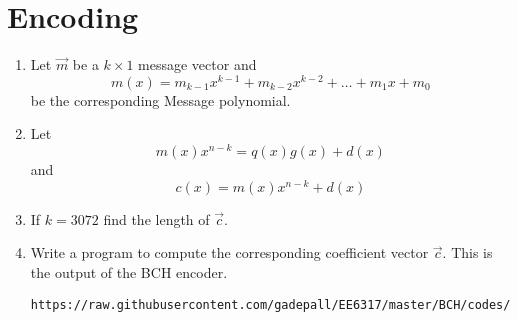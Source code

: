 \documentclass[journal,12pt,twocolumn]{IEEEtran}
\renewcommand\thesection{\arabic{section}}
\begin{document}
\section{Encoding}
\begin{enumerate}[label=\thesection.\arabic*
,ref=\thesection.\theenumi]
\item Let $\vec{m}$ be a $k \times 1$ message vector and  
\begin{equation}
m(x)=m_{k-1}x^{k-1}+m_{k-2}x^{k-2}+\dots+m_1x+m_0
\end{equation} 
be the  corresponding Message polynomial. 
\item Let 
\begin{equation}
m(x)x^{n-k} = q(x)g(x)+d(x)
\end{equation} 
and 
\begin{equation}
c(x)=m(x)x^{n-k}+d(x)
\end{equation}
%
\item If $k = 3072$ find the length of $\vec{c}$.
\item 
Write a program to compute the corresponding coefficient vector $\vec{c}$. This is the output of the BCH 
encoder.
\\
\solution
\begin{lstlisting}
https://raw.githubusercontent.com/gadepall/EE6317/master/BCH/codes/encoder.py
\end{lstlisting}
\end{enumerate}
\end{document}
